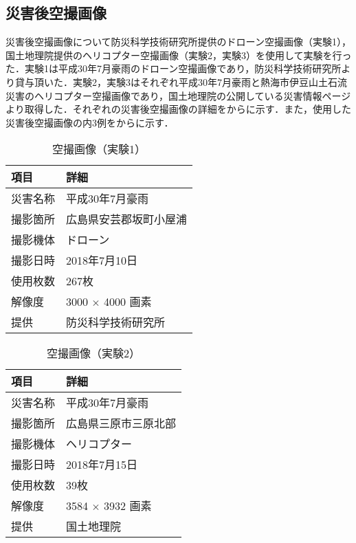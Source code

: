     \subsection*{災害後空撮画像}
      災害後空撮画像について防災科学技術研究所提供のドローン空撮画像\cite{防災科研空撮画像}（実験1），国土地理院提供のヘリコプター空撮画像\cite{国土地理院空撮画像1, 国土地理院空撮画像2}（実験2，実験3）を使用して実験を行った．実験1は平成30年7月豪雨のドローン空撮画像であり，防災科学技術研究所より貸与頂いた．実験2，実験3はそれぞれ平成30年7月豪雨と熱海市伊豆山土石流災害のヘリコプター空撮画像であり，国土地理院の公開している災害情報ページより取得した．それぞれの災害後空撮画像の詳細をからに示す．また，使用した災害後空撮画像の内3例をからに示す．

      \begin{table}[tbp]
        \centering
        \caption{空撮画像（実験1）}
        \label{空撮画像（実験1）}
        \begin{tabular}{ll}
          \hline
          \textbf{項目} & \textbf{詳細} \\
          \hline \hline
          災害名称 & 平成30年7月豪雨 \\
          撮影箇所 & 広島県安芸郡坂町小屋浦 \\
          撮影機体 & ドローン \\
          撮影日時 & 2018年7月10日 \\
          使用枚数 & 267枚 \\
          解像度 & 3000 $\times$ 4000 画素 \\
          提供 & 防災科学技術研究所 \\ \hline
        \end{tabular}
      \end{table}

      \begin{table}[tbp]
        \centering
        \caption{空撮画像（実験2）}
        \begin{tabular}{ll}
          \hline
          \textbf{項目} & \textbf{詳細} \\
          \hline \hline
          災害名称 & 平成30年7月豪雨 \\
          撮影箇所 & 広島県三原市三原北部 \\
          撮影機体 & ヘリコプター \\
          撮影日時 & 2018年7月15日 \\
          使用枚数 & 39枚 \\
          解像度 & 3584 $\times$ 3932 画素 \\
          提供 & 国土地理院 \\ \hline
        \end{tabular}
      \end{table}

